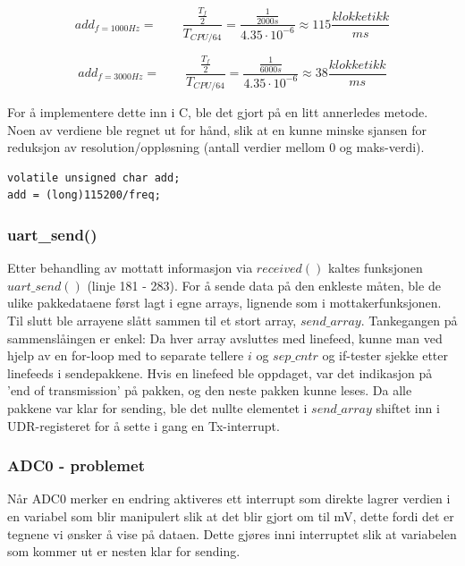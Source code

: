\documentclass[12pt, a4paper]{report}
\begin{document}
\begin{equation}
add_{f = 1000Hz} = \qquad \frac{\frac{T_{f}}{2}}{T_{CPU\slash{64}}} = \frac{\frac{1}{2000s}}{4.35\cdot 10^{-6}} \approx 115 \frac{klokketikk}{ms}
\end{equation}

\begin{equation}
add_{f = 3000Hz} = \qquad \frac{\frac{T_{f}}{2}}{T_{CPU\slash{64}}} = \frac{\frac{1}{6000s}}{4.35\cdot 10^{-6}} \approx 38 \frac{klokketikk}{ms}
\end{equation}

For å implementere dette inn i C, ble det gjort på en litt annerledes metode. Noen av verdiene ble regnet ut for hånd, slik at en kunne minske sjansen for reduksjon av resolution/oppløsning (antall verdier mellom 0 og maks-verdi). \\

\begin{lstlisting}
volatile unsigned char add;
add = (long)115200/freq;
\end{lstlisting}


\subsubsection{uart\_send()}
Etter behandling av mottatt informasjon via $received()$ kaltes funksjonen $uart\_send()$ (linje 181 - 283). For å sende data på den enkleste måten, ble de ulike pakkedataene først lagt i egne arrays, lignende som i mottakerfunksjonen. Til slutt ble arrayene slått sammen til et stort array, $send\_array$. Tankegangen på sammenslåingen er enkel: Da hver array avsluttes med linefeed, kunne man ved hjelp av en for-loop med to separate tellere $i$ og $sep\_cntr$ og if-tester sjekke etter linefeeds i sendepakkene. Hvis en linefeed ble oppdaget, var det indikasjon på 'end of transmission' på pakken, og den neste pakken kunne leses. Da alle pakkene var klar for sending, ble det nullte elementet i $send\_array$ shiftet inn i UDR-registeret for å sette i gang en Tx-interrupt.

\subsubsection{ADC0 - problemet}
Når ADC0 merker en endring aktiveres ett interrupt som direkte lagrer verdien i en variabel som blir manipulert slik at det blir gjort om til mV, dette fordi det er tegnene vi ønsker å vise på dataen. Dette gjøres inni interruptet slik at variabelen som kommer ut er nesten klar for sending.
\end{document}
